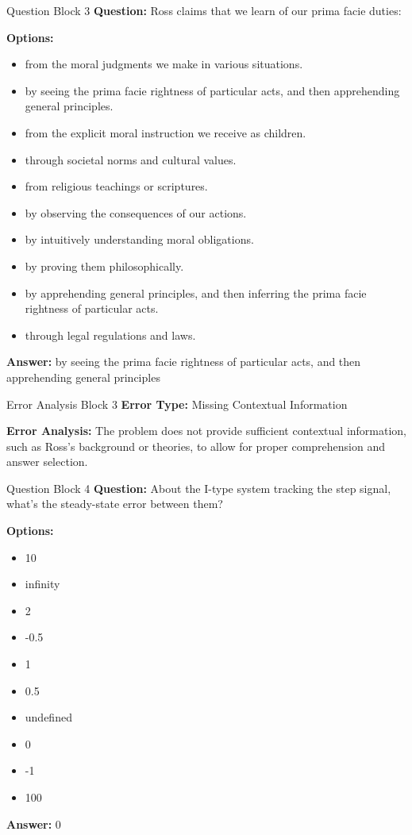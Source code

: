 \begin{questionbox}{Question Block 3}
\noindent \textbf{Question:} Ross claims that we learn of our prima facie duties:

\bigskip
\noindent \textbf{Options:}
\begin{itemize}
    \item from the moral judgments we make in various situations.
    \item by seeing the prima facie rightness of particular acts, and then apprehending general principles.
    \item from the explicit moral instruction we receive as children.
    \item through societal norms and cultural values.
    \item from religious teachings or scriptures.
    \item by observing the consequences of our actions.
    \item by intuitively understanding moral obligations.
    \item by proving them philosophically.
    \item by apprehending general principles, and then inferring the prima facie rightness of particular acts.
    \item through legal regulations and laws.
\end{itemize}

\noindent \textbf{Answer:} by seeing the prima facie rightness of particular acts, and then apprehending general principles
\end{questionbox}

\begin{errorbox}{Error Analysis Block 3}
\noindent \textbf{Error Type:} Missing Contextual Information

\noindent \textbf{Error Analysis:} The problem does not provide sufficient contextual information, such as Ross's background or theories, to allow for proper comprehension and answer selection.
\end{errorbox}

\begin{questionbox}{Question Block 4}
\noindent \textbf{Question:} About the I-type system tracking the step signal, what's the steady-state error between them?

\bigskip
\noindent \textbf{Options:}
\begin{itemize}
    \item 10
    \item infinity
    \item 2
    \item -0.5
    \item 1
    \item 0.5
    \item undefined
    \item 0
    \item -1
    \item 100
\end{itemize}

\noindent \textbf{Answer:} 0
\end{questionbox}

